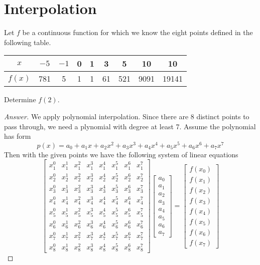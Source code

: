 \section{Interpolation}
Let $f$ be a continuous function for which we know the eight points defined in the following table.
\begin{center}
	\begin{tabular}{ccccccccc}
	\hline
	$x$ & $-5$ & $-1$ & 0 & 1 & 3 & 5 & 10 & 10 \\ \hline
	$f(x)$ & 781 & 5 & 1 & 1 & 61 & 521 & 9091 & 19141 \\ \hline
	\end{tabular}
\end{center}
Determine $f(2)$.
\begin{proof}[Answer]
We apply polynomial interpolation.
Since there are 8 distinct points to pass through, we need a plynomial with degree at least 7.
Assume the polynomial has form
\[ p(x)=a_0 + a_1 x + a_2 x^2 + a_3 x^3 + a_4 x^4 + a_5 x^5 + a_6 x^6 + a_7 x^7 \]
Then with the given points we have the following system of linear equations
\[\begin{bmatrix}
x_1^0 & x_1^1 & x_1^2 & x_1^3 & x_1^4 & x_1^5 & x_1^6 & x_1^7 \\
x_2^0 & x_2^1 & x_2^2 & x_2^3 & x_2^4 & x_2^5 & x_2^6 & x_2^7 \\
x_3^0 & x_3^1 & x_3^2 & x_3^3 & x_3^4 & x_3^5 & x_3^6 & x_3^7 \\
x_4^0 & x_4^1 & x_4^2 & x_4^3 & x_4^4 & x_4^5 & x_4^6 & x_4^7 \\
x_5^0 & x_5^1 & x_5^2 & x_5^3 & x_5^4 & x_5^5 & x_5^6 & x_5^7 \\
x_6^0 & x_6^1 & x_6^2 & x_6^3 & x_6^4 & x_6^5 & x_6^6 & x_6^7 \\
x_7^0 & x_7^1 & x_7^2 & x_7^3 & x_7^4 & x_7^5 & x_7^6 & x_7^7 \\
x_8^0 & x_8^1 & x_8^2 & x_8^3 & x_8^4 & x_8^5 & x_8^6 & x_8^7
\end{bmatrix}
\begin{bmatrix}
a_0 \\ a_1 \\ a_2 \\ a_3 \\ a_4 \\ a_5 \\ a_6 \\ a_7
\end{bmatrix}=
\begin{bmatrix}
f(x_0) \\ f(x_1) \\ f(x_2) \\ f(x_3) \\ f(x_4) \\ f(x_5) \\ f(x_6) \\ f(x_7)

\end{bmatrix}\]
\end{proof}
